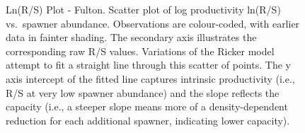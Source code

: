 \documentclass[french,11pt]{book}
\begin{document}
\begin{figure}[htb]

{\centering {} 

}

\caption{Ln(R/S) Plot - Fulton. Scatter plot of log productivity ln(R/S) vs.~spawner abundance. Observations are colour-coded, with earlier data in fainter shading. The secondary axis illustrates the corresponding raw R/S values. Variations of the Ricker model attempt to fit a straight line through this scatter of points. The y axis intercept of the fitted line captures intrinsic productivity (i.e., R/S at very low spawner abundance) and the slope reflects the capacity (i.e., a steeper slope means more of a density-dependent reduction for each additional spawner, indicating lower capacity).}\label{fig:RpSPlotFulton}
\end{figure}
\clearpage
\end{document}
